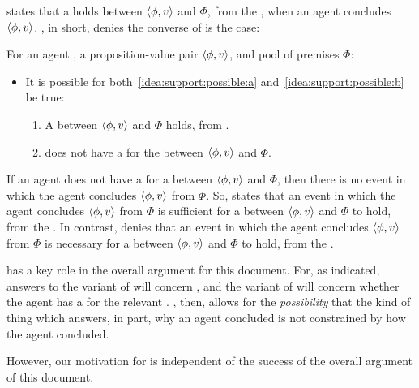 \begin{note}
  \supportI{} states that a \ros{} holds between \(\langle \phi, v \rangle\) and \(\Phi\), from the \agpe{}, when an agent concludes \(\langle \phi, v \rangle\).
  \supportII{}, in short, denies the converse of \supportI{} is the case:

  \begin{idea}[\supportII{}]
    \label{idea:support:possible}
    For an agent \vAgent{}, a proposition-value pair \(\langle \phi, v \rangle\), and pool of premises \(\Phi\):

    \begin{itemize}
    \item
      It is possible for both~\ref{idea:support:possible:a} and~\ref{idea:support:possible:b} be true:
      \begin{enumerate}[label=\alph*., ref=(\alph*)]
      \item
        \label{idea:support:possible:a}
        A \ros{} between \(\langle \phi, v \rangle\) and \(\Phi\) holds, from .
      \item
        \label{idea:support:possible:b}
        \vAgent{} does not have a \wit{} for the \ros{} between \(\langle \phi, v \rangle\) and \(\Phi\).
      \end{enumerate}
    \end{itemize}
    \vspace{-\baselineskip}
  \end{idea}

  If an agent does not have a \wit{} for a \ros{} between \(\langle \phi, v \rangle\) and \(\Phi\), then there is no event in which the agent concludes \(\langle \phi, v \rangle\) from \(\Phi\).
  So, \supportI{} states that an event in which the agent concludes \(\langle \phi, v \rangle\) from \(\Phi\) is sufficient for a \ros{} between \(\langle \phi, v \rangle\) and \(\Phi\) to hold, from the \agpe{}.
  In contrast, \supportII{} denies that an event in which the agent concludes \(\langle \phi, v \rangle\) from \(\Phi\) is necessary for a \ros{} between \(\langle \phi, v \rangle\) and \(\Phi\) to hold, from the \agpe{}.
\end{note}

\begin{note}
  \supportII{} has a key role in the overall argument for this document.
  For, as indicated, answers to the variant of \qWhy{} will concern \ros{}, and the variant of \qHow{} will concern whether the agent has a \wit{} for the relevant \ros{}.
  \supportII{}, then, allows for the \emph{possibility} that the kind of thing which answers, in part, why an agent concluded is not constrained by how the agent concluded.

  However, our motivation for \supportII{} is independent of the success of the overall argument of this document.
\end{note}

